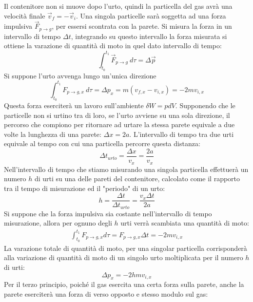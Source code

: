 \documentclass{article}
\numberwithin{equation}{subsection}
\begin{document}
Il contenitore non si muove 
dopo l'urto, quindi la particella del gas avrà una velocità 
finale $\vec v_f=-\vec v_i$.  
Una singola particelle sarà soggetta ad una forza impulsiva 
$\vec{F}_{p\to g}$, 
per essersi scontrata con la parete. Si misura la forza in 
un intervallo di tempo $\Delta t$, integrando su questo intervallo la forza misurata si ottiene 
la varazione di quantità di moto in quel dato intervallo di tempo:
\begin{equation*}
    \int_{t_0}^{t_1}\vec{F}_{p\to g}\:d\tau=\Delta\vec{p}
\end{equation*}
Si suppone l'urto avvenga lungo un'unica direzione
\begin{equation*}
    \int_{t_0}^{t_1}F_{p\to g, x}\:d\tau=\Delta p_x=m(v_{f,x}-v_{i,x})=-2mv_{i,x}
\end{equation*}
Questa forza eserciterà un lavoro sull'ambiente 
$\delta W=pdV$. Supponendo che le particelle non si urtino 
tra di loro, se l'urto avviene su una sola direzione, il percorso che compiono per ritornare ad urtare la stessa parete equivale a due volte la lunghezza di una parete: 
$\Delta x=2a$. 
L'intervallo di tempo tra due urti equivale al tempo con 
cui una particella percorre questa distanza: 
\begin{equation*}
    \Delta t_{urto}=\displaystyle\frac{\Delta x}{v_x}=\frac{2a}{v_x}
\end{equation*}
Nell'intervallo di tempo che stiamo misurando una singola particella effettuerà  
un numero $h$ di urti su una delle pareti del contenitore, calcolato come il rapporto tra il tempo di misurazione ed il "periodo" di un urto: 
\begin{equation*}
    h=\displaystyle\frac{\Delta t}{\Delta t_{urto}}=\frac{v_x\Delta t}{2a}
\end{equation*}
Si suppone che la forza impulsiva sia costante nell'intervallo di tempo 
misurazione, allora per ognuno degli $h$ urti verrà scambiata una 
quantità di moto:
\begin{gather*}
    \int_{t_0}^{t_1}F_{p\to g,x}d\tau=F_{p\to g,x}\Delta t=-2mv_{i,x}
\end{gather*}
La varazione totale di quantità di moto, per una singolar particella corrisponderà alla variazione di quantità di moto di un singolo urto moltiplicata per il numero $h$ di 
urti: 
\begin{equation*}
    \Delta p_x=-2hmv_{i,x}
\end{equation*}
Per il terzo principio, poiché il gas esercita una certa forza sulla parete, anche la parete eserciterà una forza di verso opposto e stesso modulo sul gas: 
\end{document}
